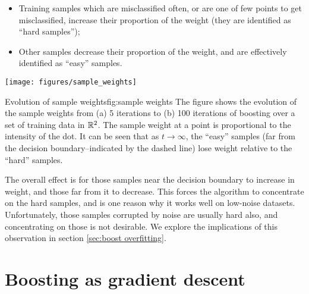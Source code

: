 \begin{itemize}
\item	Training samples which are misclassified often, or are one of 
	few points to get misclassified, increase their proportion of
	the weight (they are identified as ``hard samples'');
\item	Other samples decrease their proportion of the weight, and are
	effectively identified as ``easy'' samples.
\end{itemize}

\begin{linefigure}
\begin{center}
\texttt{[image: figures/sample\_weights]}
\end{center}
\begin{capt}{Evolution of sample weights}{fig:sample weights}
The figure shows the evolution of the sample weights from (a) 5
iterations to (b) 100 iterations of boosting over a set of training
data in $\mathbb{R}^2$.  The sample weight at a point is proportional to the
intensity of the dot.  It can be seen that as $t \rightarrow \infty$,
the ``easy'' samples (far from the decision boundary--indicated by the
dashed line) lose weight relative to the ``hard'' samples.   
\end{capt}
\end{linefigure}

The overall effect is for those samples near the decision boundary to
increase in weight, and those far from it to decrease.  This forces
the algorithm to concentrate on the hard samples, and is one reason
why it works well on low-noise datasets.  Unfortunately, those samples
corrupted by noise are usually hard also, and concentrating on those
is not desirable.  We explore the implications of this observation in
section \ref{sec:boost overfitting}.


\section{Boosting as gradient descent}
\label{sec:theory:gradient descent}

